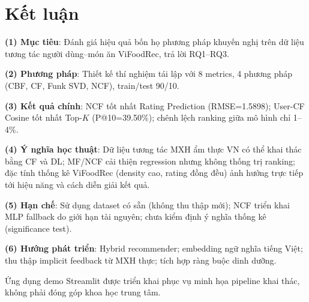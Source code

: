 \documentclass[11pt]{article}
\begin{document}
\section{Kết luận}
\label{sec:conclusion}

\textbf{(1) Mục tiêu}: Đánh giá hiệu quả bốn họ phương pháp khuyến nghị trên dữ liệu tương tác người dùng--món ăn ViFoodRec, trả lời RQ1--RQ3.

\textbf{(2) Phương pháp}: Thiết kế thí nghiệm tái lập với 8 metrics, 4 phương pháp (CBF, CF, Funk SVD, NCF), train/test 90/10.

\textbf{(3) Kết quả chính}: NCF tốt nhất Rating Prediction (RMSE=1.5898); User-CF Cosine tốt nhất Top-$K$ (P@10=39.50\%); chênh lệch ranking giữa mô hình chỉ 1--4\%.

\textbf{(4) Ý nghĩa học thuật}: Dữ liệu tương tác MXH ẩm thực VN có thể khai thác bằng CF và DL; MF/NCF cải thiện regression nhưng không thống trị ranking; đặc tính thống kê ViFoodRec (density cao, rating đồng đều) ảnh hưởng trực tiếp tới hiệu năng và cách diễn giải kết quả.

\textbf{(5) Hạn chế}: Sử dụng dataset có sẵn (không thu thập mới); NCF triển khai MLP fallback do giới hạn tài nguyên; chưa kiểm định ý nghĩa thống kê (significance test).

\textbf{(6) Hướng phát triển}: Hybrid recommender; embedding ngữ nghĩa tiếng Việt; thu thập implicit feedback từ MXH thực; tích hợp ràng buộc dinh dưỡng.

Ứng dụng demo Streamlit được triển khai phục vụ minh họa pipeline khai thác, không phải đóng góp khoa học trung tâm.

\appendix
\end{document}
